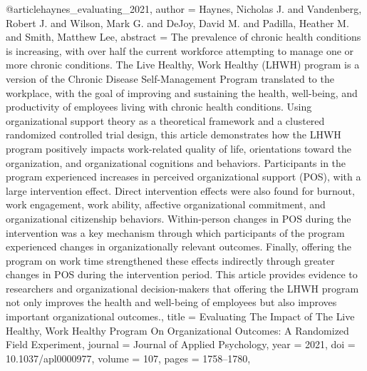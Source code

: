 @article{haynes_evaluating_2021,
  author = {Haynes, Nicholas J. and Vandenberg, Robert J. and Wilson, Mark G. and DeJoy, David M. and Padilla, Heather M. and Smith, Matthew Lee},
  abstract = {The prevalence of chronic health conditions is increasing, with over half the current workforce attempting to manage one or more chronic conditions. The Live Healthy, Work Healthy (LHWH) program is a version of the Chronic Disease Self-Management Program translated to the workplace, with the goal of improving and sustaining the health, well-being, and productivity of employees living with chronic health conditions. Using organizational support theory as a theoretical framework and a clustered randomized controlled trial design, this article demonstrates how the LHWH program positively impacts work-related quality of life, orientations toward the organization, and organizational cognitions and behaviors. Participants in the program experienced increases in perceived organizational support (POS), with a large intervention effect. Direct intervention effects were also found for burnout, work engagement, work ability, affective organizational commitment, and organizational citizenship behaviors. Within-person changes in POS during the intervention was a key mechanism through which participants of the program experienced changes in organizationally relevant outcomes. Finally, offering the program on work time strengthened these effects indirectly through greater changes in POS during the intervention period. This article provides evidence to researchers and organizational decision-makers that offering the LHWH program not only improves the health and well-being of employees but also improves important organizational outcomes.},
  title = {{Evaluating} {The} {Impact} {of} {The} {Live} {Healthy}, {Work} {Healthy} {Program} {On} {Organizational} {Outcomes}: {A} {Randomized} {Field} {Experiment}},
  journal = {Journal of Applied Psychology},
  year = {2021},
  doi = {10.1037/apl0000977},
  volume = {107},
  pages = {1758--1780},
}

